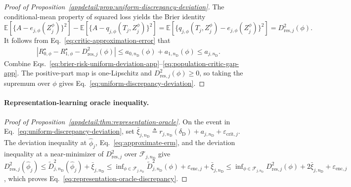 \begin{proof}[Proof of Proposition~\ref{appdetail:prop:uniform-discrepancy-deviation}]
The conditional-mean property of squared loss yields the Brier identity
\(\mathbb E[\{A-e_{j,\phi}(Z_j^\phi)\}^2] -\mathbb E[\{A-q_{j,\phi}(T_j,Z_j^\phi)\}^2] = \mathbb E[\{q_{j,\phi}(T_j,Z_j^\phi)-e_{j,\phi}(Z_j^\phi)\}^2] =D_{\mathrm{res},j}^2(\phi).\)
It follows from Eq.~\eqref{eq:critic-approximation-error} that
\begin{align}
\left|
R_{0,\phi}^{\star}-R_{1,\phi}^{\star}
-D_{\mathrm{res},j}^2(\phi)
\right|
\le
a_{0,n_{\mathrm D}}(\phi)+a_{1,n_{\mathrm D}}(\phi)
\le a_{j,n_{\mathrm D}}.
\label{eq:population-critic-gap-app}
\end{align}
Combine Eqs.~\eqref{eq:brier-risk-uniform-deviation-app}--\eqref{eq:population-critic-gap-app}. The positive-part map is one-Lipschitz and $D_{\mathrm{res},j}^2(\phi)\ge0$, so taking the supremum over $\phi$ gives Eq.~\eqref{eq:uniform-discrepancy-deviation}.
\end{proof}

\paragraph{Representation-learning oracle inequality.}
\begin{proof}[Proof of Proposition~\ref{appdetail:thm:representation-oracle}]
On the event in Eq.~\eqref{eq:uniform-discrepancy-deviation}, set
\(\bar\xi_{j,n_{\mathrm D}} \triangleq r_{j,n_{\mathrm D}}(\delta_{\mathrm D})+a_{j,n_{\mathrm D}}+\varepsilon_{\mathrm{crit},j}.\)
The deviation inequality at $\widehat\phi_j$, Eq.~\eqref{eq:approximate-erm}, and the deviation inequality at a near-minimizer of $D_{\mathrm{res},j}^2$ over $\mathcal F_{j,n_{\mathrm D}}$ give
\(D_{\mathrm{res},j}^2(\widehat\phi_j) \le \widetilde D_{j,n_{\mathrm D}}^2(\widehat\phi_j)+\bar\xi_{j,n_{\mathrm D}} \le \inf_{\phi\in\mathcal F_{j,n_{\mathrm D}}} \widetilde D_{j,n_{\mathrm D}}^2(\phi) +\varepsilon_{\mathrm{enc},j}+\bar\xi_{j,n_{\mathrm D}} \le \inf_{\phi\in\mathcal F_{j,n_{\mathrm D}}} D_{\mathrm{res},j}^2(\phi) +2\bar\xi_{j,n_{\mathrm D}}+\varepsilon_{\mathrm{enc},j}\),
which proves Eq.~\eqref{eq:representation-oracle-discrepancy}.
\end{proof}

